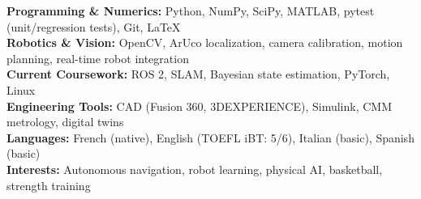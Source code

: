 \documentclass[10pt]{article}
\begin{document}
\textbf{Programming \& Numerics:} Python, NumPy, SciPy, MATLAB, pytest (unit/regression tests), Git, LaTeX\\
\textbf{Robotics \& Vision:} OpenCV, ArUco localization, camera calibration, motion planning, real-time robot integration\\
\textbf{Current Coursework:} ROS 2, SLAM, Bayesian state estimation, PyTorch, Linux\\
\textbf{Engineering Tools:} CAD (Fusion 360, 3DEXPERIENCE), Simulink, CMM metrology, digital twins\\
\textbf{Languages:} French (native), English (TOEFL iBT: 5/6), Italian (basic), Spanish (basic)\\
\textbf{Interests:} Autonomous navigation, robot learning, physical AI, basketball, strength training
\end{document}
